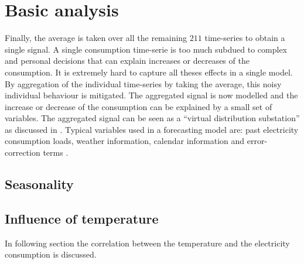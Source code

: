 \section{Basic analysis}
Finally, the average is taken over all the remaining $211$ time-series to obtain a single signal. A single consumption time-serie is too much subdued to complex and personal decisions that can explain increases or decreases of the consumption. It is extremely hard to capture all theses effects in a single model. By aggregation of the individual time-series by taking the average, this noisy individual behaviour is mitigated. The aggregated signal is now modelled and the increase or decrease of the consumption can be explained by a small set of variables. The aggregated signal can be seen as a ``virtual distribution substation'' as discussed in \cite{Hoverstad2015}. Typical variables used in a forecasting model are: past electricity consumption loads, weather information, calendar information and error-correction terms \cite{loadforecastingmoor}.

\subsection{Seasonality}





\subsection{Influence of temperature}
In following section the correlation between the temperature and the electricity consumption is discussed.\\


